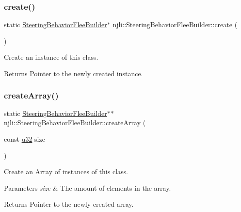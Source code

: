 \subsubsection{\texorpdfstring{create()}{create()}}
{\footnotesize\ttfamily static \mbox{\hyperlink{classnjli_1_1_steering_behavior_flee_builder}{Steering\+Behavior\+Flee\+Builder}}$\ast$ njli\+::\+Steering\+Behavior\+Flee\+Builder\+::create (\begin{DoxyParamCaption}{ }\end{DoxyParamCaption})\hspace{0.3cm}{\ttfamily [static]}}

Create an instance of this class.

\begin{DoxyReturn}{Returns}
Pointer to the newly created instance. 
\end{DoxyReturn}
\mbox{\label{classnjli_1_1_steering_behavior_flee_builder_a3e15b86e49d246af24205b824649dcf8}} 
\subsubsection{\texorpdfstring{create\+Array()}{createArray()}}
{\footnotesize\ttfamily static \mbox{\hyperlink{classnjli_1_1_steering_behavior_flee_builder}{Steering\+Behavior\+Flee\+Builder}}$\ast$$\ast$ njli\+::\+Steering\+Behavior\+Flee\+Builder\+::create\+Array (\begin{DoxyParamCaption}\item[{const \mbox{\hyperlink{_util_8h_a10e94b422ef0c20dcdec20d31a1f5049}{u32}}}]{size }\end{DoxyParamCaption})\hspace{0.3cm}{\ttfamily [static]}}

Create an Array of instances of this class.


\begin{DoxyParams}{Parameters}
{\em size} & The amount of elements in the array.\\
\hline
\end{DoxyParams}
\begin{DoxyReturn}{Returns}
Pointer to the newly created array. 
\end{DoxyReturn}
\mbox{\label{classnjli_1_1_steering_behavior_flee_builder_ae60ff44542e4b9b7d664bef80b1f1767}} 
